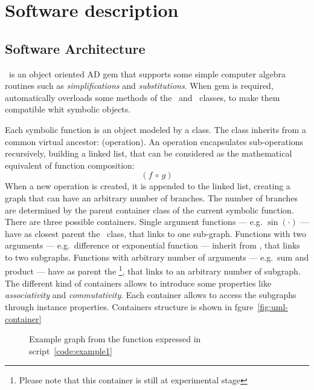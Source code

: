\section{Software description}
\label{sec:description}


\subsection{Software Architecture}
\label{sec:architecture}


\ragnicas~is an object oriented AD gem that supports some simple computer algebra routines such as \emph{simplifications} and \emph{substitutions}. When gem is required, automatically overloads some methods of the \Fixnum~and \Float~classes, to make them compatible whit symbolic objects.

Each symbolic function is an object modeled by a class. The class inherits from a common virtual ancestor: \CASOp (operation). An operation encapsulates sub-operations recursively, building a linked list, that can be considered as the mathematical equivalent of function composition:
\begin{equation}
\left( f \, \circ \, g \right)
\end{equation}
When a new operation is created, it is appended to the linked list, creating a graph that can have an arbitrary number of branches. The number of branches are determined by the parent container class of the current symbolic function. There are three possible containers. Single argument functions --- e.g. $\sin(\cdot)$ --- have as closest parent the \CASOp~class, that links to one sub-graph. Functions with two arguments --- e.g.\ difference or exponential function --- inherit from \CASBinaryOp, that links to two subgraphs. Functions with arbitrary number of arguments --- e.g.\ sum and product --- have as parent the \CASNaryOp\footnote{Please note that this container is still at experimental stage}, that links to an arbitrary number of subgraph. The different kind of containers allows to introduce some properties like \emph{associativity} and \emph{commutativity}. Each container allows to access the subgraphs through instance properties. Containers structure is shown in fgure~\ref{fig:uml-container}
\begin{figure}[ht!]
\label{fig:graph}
\centering

\caption{Example graph from the function expressed in script~\ref{code:example1}}
\end{figure}

